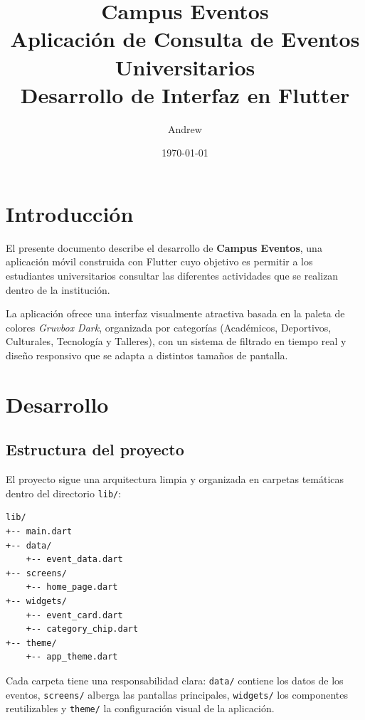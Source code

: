 \documentclass[12pt, a4paper]{article}
\title{\textbf{Campus Eventos} \\ \large Aplicación de Consulta de Eventos Universitarios \\ \normalsize Desarrollo de Interfaz en Flutter}
\author{Andrew}
\date{\today}
\begin{document}
\maketitle
\thispagestyle{empty}

\newpage
\tableofcontents
\newpage

\section{Introducción}

El presente documento describe el desarrollo de \textbf{Campus Eventos}, una aplicación móvil construida con Flutter cuyo objetivo es permitir a los estudiantes universitarios consultar las diferentes actividades que se realizan dentro de la institución.

La aplicación ofrece una interfaz visualmente atractiva basada en la paleta de colores \textit{Gruvbox Dark}, organizada por categorías (Académicos, Deportivos, Culturales, Tecnología y Talleres), con un sistema de filtrado en tiempo real y diseño responsivo que se adapta a distintos tamaños de pantalla.

\section{Desarrollo}

\subsection{Estructura del proyecto}

El proyecto sigue una arquitectura limpia y organizada en carpetas temáticas dentro del directorio \texttt{lib/}:

\begin{lstlisting}[basicstyle=\ttfamily\small, frame=none, numbers=none]
lib/
+-- main.dart
+-- data/
    +-- event_data.dart
+-- screens/
    +-- home_page.dart
+-- widgets/
    +-- event_card.dart
    +-- category_chip.dart
+-- theme/
    +-- app_theme.dart
\end{lstlisting}

Cada carpeta tiene una responsabilidad clara: \texttt{data/} contiene los datos de los eventos, \texttt{screens/} alberga las pantallas principales, \texttt{widgets/} los componentes reutilizables y \texttt{theme/} la configuración visual de la aplicación.
\end{document}
